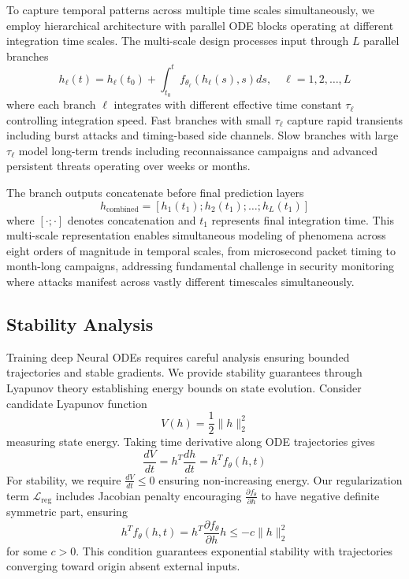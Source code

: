 \documentclass[10pt,journal,compsoc]{IEEEtran}
\begin{document}
To capture temporal patterns across multiple time scales simultaneously, we employ hierarchical architecture with parallel ODE blocks operating at different integration time scales. The multi-scale design processes input through $L$ parallel branches
\begin{equation}
h_\ell(t) = h_\ell(t_0) + \int_{t_0}^{t} f_{\theta_\ell}(h_\ell(s), s) ds, \quad \ell = 1, 2, \ldots, L
\end{equation}
where each branch $\ell$ integrates with different effective time constant $\tau_\ell$ controlling integration speed. Fast branches with small $\tau_\ell$ capture rapid transients including burst attacks and timing-based side channels. Slow branches with large $\tau_\ell$ model long-term trends including reconnaissance campaigns and advanced persistent threats operating over weeks or months.

The branch outputs concatenate before final prediction layers
\begin{equation}
h_{\text{combined}} = [h_1(t_1); h_2(t_1); \ldots; h_L(t_1)]
\end{equation}
where $[\cdot; \cdot]$ denotes concatenation and $t_1$ represents final integration time. This multi-scale representation enables simultaneous modeling of phenomena across eight orders of magnitude in temporal scales, from microsecond packet timing to month-long campaigns, addressing fundamental challenge in security monitoring where attacks manifest across vastly different timescales simultaneously.

\subsection{Stability Analysis}

Training deep Neural ODEs requires careful analysis ensuring bounded trajectories and stable gradients. We provide stability guarantees through Lyapunov theory establishing energy bounds on state evolution. Consider candidate Lyapunov function
\begin{equation}
V(h) = \frac{1}{2}\|h\|_2^2
\end{equation}
measuring state energy. Taking time derivative along ODE trajectories gives
\begin{equation}
\frac{dV}{dt} = h^T \frac{dh}{dt} = h^T f_\theta(h, t)
\end{equation}
For stability, we require $\frac{dV}{dt} \leq 0$ ensuring non-increasing energy. Our regularization term $\mathcal{L}_{\text{reg}}$ includes Jacobian penalty encouraging $\frac{\partial f_\theta}{\partial h}$ to have negative definite symmetric part, ensuring
\begin{equation}
h^T f_\theta(h, t) = h^T \frac{\partial f_\theta}{\partial h} h \leq -c\|h\|_2^2
\end{equation}
for some $c > 0$. This condition guarantees exponential stability with trajectories converging toward origin absent external inputs.
\end{document}

